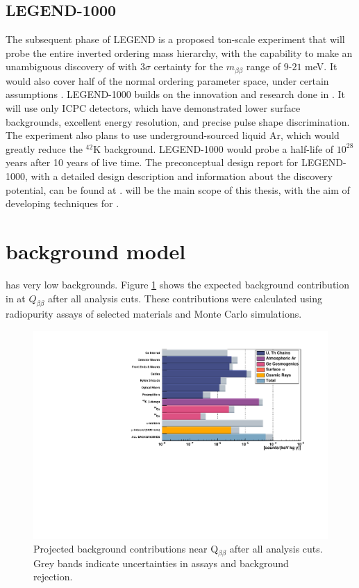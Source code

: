 \subsection{LEGEND-1000}
The subsequent phase of LEGEND is a proposed ton-scale experiment that will probe the entire inverted ordering mass hierarchy, with the capability to make an unambiguous discovery of {\onbb} with $3\sigma$ certainty for the $m_{\beta\beta}$ range of $9$-$21$ meV. It would also cover half of the normal ordering parameter space, under certain assumptions \cite{l1000_pcdr}. LEGEND-1000 builds on the innovation and research done in {\Ltwo}. It will use only ICPC detectors, which have demonstrated lower surface backgrounds, excellent energy resolution, and precise pulse shape discrimination. The experiment also plans to use underground-sourced liquid Ar, which would greatly reduce the $^{42}$K background. LEGEND-1000 would probe a half-life of $10^{28}$ years after 10 years of live time. The preconceptual design report for LEGEND-1000, with a detailed design description and information about the discovery potential, can be found at \cite{l1000_pcdr}. {\Ltwo} will be the main scope of this thesis, with the aim of developing techniques for {\Lthou}.




\section{{\Ltwo} background model}
{\Ltwo} has very low backgrounds. Figure \ref{fig:L200_background} shows the expected background contribution in {\Ltwo} at $Q_{\beta \beta}$ after all analysis cuts. These contributions were calculated using radiopurity assays of selected materials and Monte Carlo simulations. 

\begin{figure}[!htb]
\centering
  \includegraphics[width=0.99\linewidth]{ch2/figs/L200_background.pdf}
  \caption{{\Ltwo} Projected background contributions near Q$_{\beta\beta}$ after all analysis cuts. Grey bands indicate uncertainties in assays and background rejection.}
\label{fig:L200_background}
  \end{figure}

